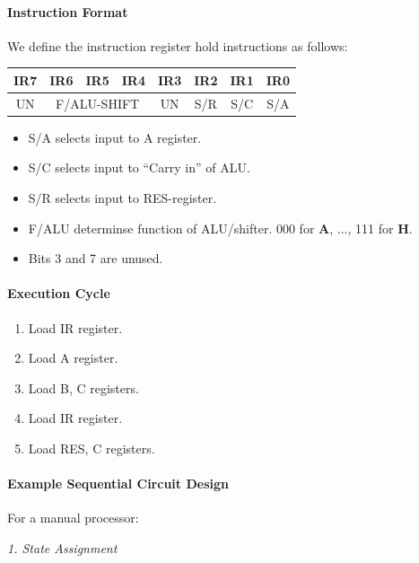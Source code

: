 \documentclass[twocolumn,english]{article}
\providecommand{\tabularnewline}{\\}
\begin{document}
\paragraph{\noindent Instruction Format}

\noindent We define the instruction register hold instructions as
follows:

\noindent 
\begin{table}[H]
\noindent \centering{}%
\begin{tabular}{cccccccc}
\toprule 
IR7 & IR6 & IR5 & IR4 & IR3 & IR2 & IR1 & IR0\tabularnewline
\midrule 
UN & \multicolumn{3}{c}{F/ALU-SHIFT} & UN & S/R & S/C & S/A\tabularnewline
\bottomrule
\end{tabular}
\end{table}

\begin{itemize}
\item S/A selects input to A register.
\item S/C selects input to ``Carry in'' of ALU.
\item S/R selects input to RES-register.
\item F/ALU determinse function of ALU/shifter. 000 for \textbf{A}, ...,
111 for \textbf{H}.
\item Bits 3 and 7 are unused.
\end{itemize}

\paragraph{Execution Cycle}
\begin{enumerate}
\item Load IR register.
\item Load A register.
\item Load B, C registers.
\item Load IR register.
\item Load RES, C registers.
\end{enumerate}

\paragraph{Example Sequential Circuit Design}

For a manual processor:

\emph{1. State Assignment}
\end{document}
